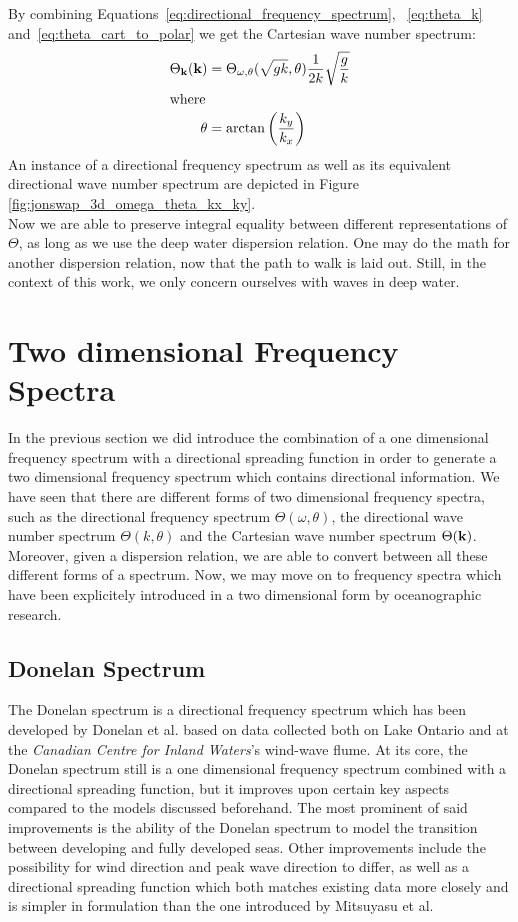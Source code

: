 %
By combining Equations~\ref{eq:directional_frequency_spectrum}, 
~\ref{eq:theta_k} and~\ref{eq:theta_cart_to_polar} we get the Cartesian wave 
number spectrum:
%
\begin{align}
\Theta_{\mathbf{k}}(\mathbf{k}) &= \Theta_{\omega,\theta}(\sqrt{gk}, 
\theta)\frac{1}{2k}\sqrt{\frac{g}{k}}\\
\intertext{where}
\theta &= \arctan\left(\frac{k_y}{k_x}\right)
\end{align}
%
An instance of a directional frequency spectrum as well as its equivalent
directional wave number spectrum are depicted in Figure
\ref{fig:jonswap_3d_omega_theta_kx_ky}.\\

Now we are able to preserve integral equality between different representations 
of $\Theta$, as long as we use the deep water dispersion relation. One may do 
the math for another dispersion relation, now that the path to walk is laid 
out. Still, in the context of this work, we only concern ourselves with waves 
in deep water.
%
\section{Two dimensional Frequency Spectra}
\label{sec:two_dimensional_frequency_spectra}
%
In the previous section we did introduce the combination of a one dimensional 
frequency spectrum with a directional spreading function in order to generate a 
two dimensional frequency spectrum which contains directional information. We 
have seen that there are different forms of two dimensional frequency spectra, 
such as the directional frequency spectrum $\Theta(\omega, \theta)$, the 
directional wave number spectrum $\Theta(k, \theta)$ and the Cartesian wave 
number spectrum $\Theta(\mathbf{k})$. Moreover, given a dispersion relation, we 
are able to convert between all these different forms of a spectrum. Now, we 
may move on to frequency spectra which have been explicitely introduced in a two 
dimensional form by oceanographic research.

\subsection{Donelan Spectrum}
%
% 
The Donelan spectrum is a directional frequency spectrum which has 
been developed by Donelan et al. \cite{article:Donelan1985} based on data 
collected both on Lake Ontario and at the \emph{Canadian Centre for Inland 
Waters}'s wind-wave flume. At its core, the Donelan spectrum still is a one 
dimensional frequency spectrum combined with a directional spreading function, 
but it improves upon certain key aspects compared to the models discussed 
beforehand. The most prominent of said improvements is the ability of the 
Donelan spectrum to model the transition between developing and fully developed 
seas. Other improvements include the possibility for wind direction and peak 
wave direction to differ, as well as a directional spreading function which both
matches existing data more closely and is simpler in formulation than the one 
introduced by Mitsuyasu et al.

